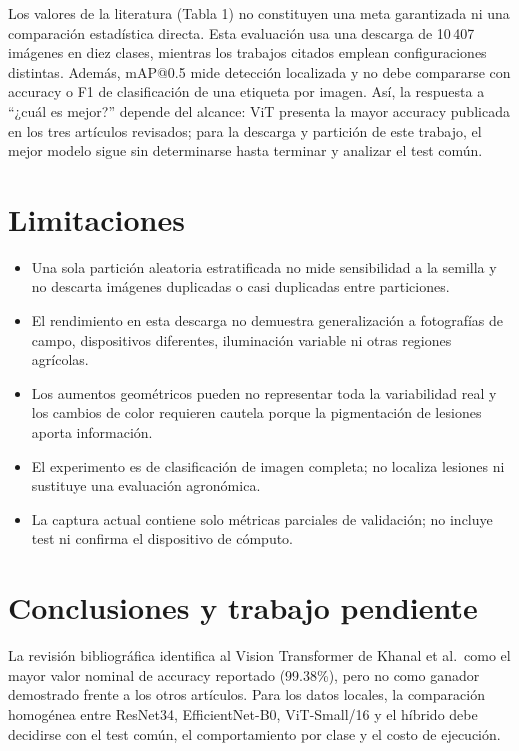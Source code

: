 \documentclass[11pt,a4paper]{article}
\begin{document}
Los valores de la literatura (Tabla 1) no constituyen una meta garantizada ni una comparación estadística directa. Esta evaluación usa una descarga de 10\,407 imágenes en diez clases, mientras los trabajos citados emplean configuraciones distintas. Además, mAP@0.5 mide detección localizada y no debe compararse con accuracy o F1 de clasificación de una etiqueta por imagen. Así, la respuesta a ``¿cuál es mejor?'' depende del alcance: ViT presenta la mayor accuracy publicada en los tres artículos revisados; para la descarga y partición de este trabajo, el mejor modelo sigue sin determinarse hasta terminar y analizar el test común.

\section{Limitaciones}
\begin{itemize}[leftmargin=*]
    \item Una sola partición aleatoria estratificada no mide sensibilidad a la semilla y no descarta imágenes duplicadas o casi duplicadas entre particiones.
    \item El rendimiento en esta descarga no demuestra generalización a fotografías de campo, dispositivos diferentes, iluminación variable ni otras regiones agrícolas.
    \item Los aumentos geométricos pueden no representar toda la variabilidad real y los cambios de color requieren cautela porque la pigmentación de lesiones aporta información.
    \item El experimento es de clasificación de imagen completa; no localiza lesiones ni sustituye una evaluación agronómica.
    \item La captura actual contiene solo métricas parciales de validación; no incluye test ni confirma el dispositivo de cómputo.
\end{itemize}

\section{Conclusiones y trabajo pendiente}
La revisión bibliográfica identifica al Vision Transformer de Khanal et al.\ como el mayor valor nominal de accuracy reportado (99.38\%), pero no como ganador demostrado frente a los otros artículos. Para los datos locales, la comparación homogénea entre ResNet34, EfficientNet-B0, ViT-Small/16 y el híbrido debe decidirse con el test común, el comportamiento por clase y el costo de ejecución.
\end{document}
